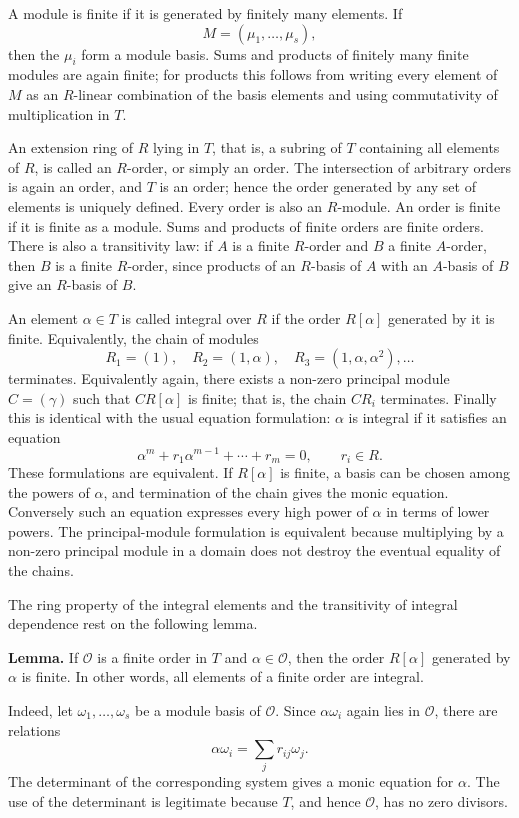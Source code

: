 \documentclass[11pt]{article}
\begin{document}
A module is finite if it is generated by finitely many elements. If
\[
  M=(\mu_1,\ldots,\mu_s),
\]
then the $\mu_i$ form a module basis. Sums and products of finitely many finite modules are again finite; for products this follows from writing every element of $M$ as an $R$-linear combination of the basis elements and using commutativity of multiplication in $T$.

An extension ring of $R$ lying in $T$, that is, a subring of $T$ containing all elements of $R$, is called an $R$-order, or simply an order. The intersection of arbitrary orders is again an order, and $T$ is an order; hence the order generated by any set of elements is uniquely defined. Every order is also an $R$-module. An order is finite if it is finite as a module. Sums and products of finite orders are finite orders. There is also a transitivity law: if $A$ is a finite $R$-order and $B$ a finite $A$-order, then $B$ is a finite $R$-order, since products of an $R$-basis of $A$ with an $A$-basis of $B$ give an $R$-basis of $B$.

An element $\alpha\in T$ is called integral over $R$ if the order $R[\alpha]$ generated by it is finite. Equivalently, the chain of modules
\[
  R_1=(1),\quad R_2=(1,\alpha),\quad R_3=(1,\alpha,\alpha^2),\ldots
\]
terminates. Equivalently again, there exists a non-zero principal module $C=(\gamma)$ such that $C R[\alpha]$ is finite; that is, the chain $C R_i$ terminates. Finally this is identical with the usual equation formulation: $\alpha$ is integral if it satisfies an equation
\[
  \alpha^m+r_1\alpha^{m-1}+\cdots+r_m=0,
  \qquad r_i\in R.
\]
These formulations are equivalent. If $R[\alpha]$ is finite, a basis can be chosen among the powers of $\alpha$, and termination of the chain gives the monic equation. Conversely such an equation expresses every high power of $\alpha$ in terms of lower powers. The principal-module formulation is equivalent because multiplying by a non-zero principal module in a domain does not destroy the eventual equality of the chains.

The ring property of the integral elements and the transitivity of integral dependence rest on the following lemma.

\textbf{Lemma.} If $\mathcal O$ is a finite order in $T$ and $\alpha\in\mathcal O$, then the order $R[\alpha]$ generated by $\alpha$ is finite. In other words, all elements of a finite order are integral.

Indeed, let $\omega_1,\ldots,\omega_s$ be a module basis of $\mathcal O$. Since $\alpha\omega_i$ again lies in $\mathcal O$, there are relations
\[
  \alpha\omega_i=\sum_j r_{ij}\omega_j.
\]
The determinant of the corresponding system gives a monic equation for $\alpha$. The use of the determinant is legitimate because $T$, and hence $\mathcal O$, has no zero divisors.
\end{document}
